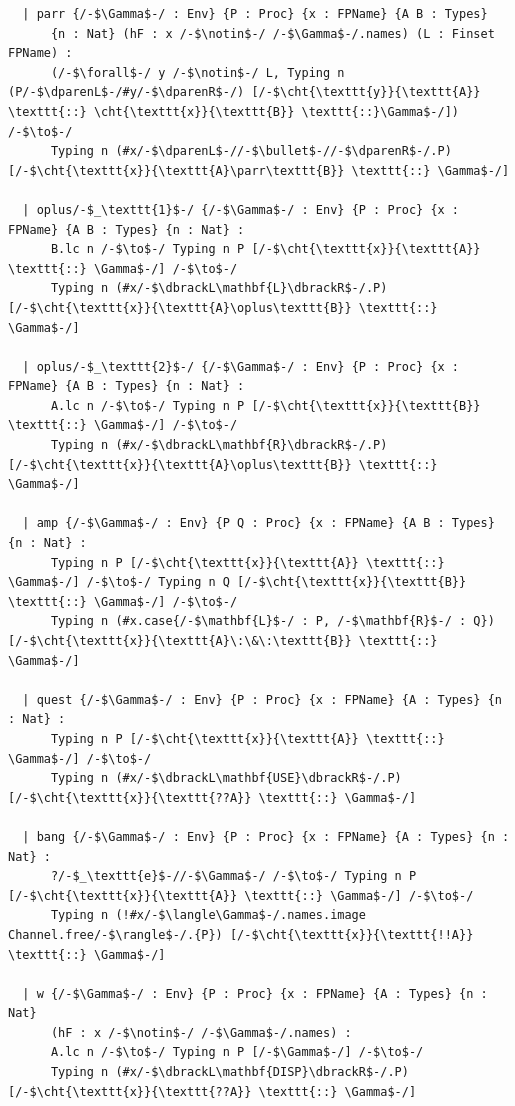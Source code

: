 \begin{lstlisting}
  | parr {/-$\Gamma$-/ : Env} {P : Proc} {x : FPName} {A B : Types}
      {n : Nat} (hF : x /-$\notin$-/ /-$\Gamma$-/.names) (L : Finset FPName) :
      (/-$\forall$-/ y /-$\notin$-/ L, Typing n (P/-$\dparenL$-/#y/-$\dparenR$-/) [/-$\cht{\texttt{y}}{\texttt{A}} \texttt{::} \cht{\texttt{x}}{\texttt{B}} \texttt{::}\Gamma$-/]) /-$\to$-/
      Typing n (#x/-$\dparenL$-//-$\bullet$-//-$\dparenR$-/.P) [/-$\cht{\texttt{x}}{\texttt{A}\parr\texttt{B}} \texttt{::} \Gamma$-/]

  | oplus/-$_\texttt{1}$-/ {/-$\Gamma$-/ : Env} {P : Proc} {x : FPName} {A B : Types} {n : Nat} :
      B.lc n /-$\to$-/ Typing n P [/-$\cht{\texttt{x}}{\texttt{A}} \texttt{::} \Gamma$-/] /-$\to$-/
      Typing n (#x/-$\dbrackL\mathbf{L}\dbrackR$-/.P) [/-$\cht{\texttt{x}}{\texttt{A}\oplus\texttt{B}} \texttt{::} \Gamma$-/]

  | oplus/-$_\texttt{2}$-/ {/-$\Gamma$-/ : Env} {P : Proc} {x : FPName} {A B : Types} {n : Nat} :
      A.lc n /-$\to$-/ Typing n P [/-$\cht{\texttt{x}}{\texttt{B}} \texttt{::} \Gamma$-/] /-$\to$-/
      Typing n (#x/-$\dbrackL\mathbf{R}\dbrackR$-/.P) [/-$\cht{\texttt{x}}{\texttt{A}\oplus\texttt{B}} \texttt{::} \Gamma$-/]

  | amp {/-$\Gamma$-/ : Env} {P Q : Proc} {x : FPName} {A B : Types} {n : Nat} :
      Typing n P [/-$\cht{\texttt{x}}{\texttt{A}} \texttt{::} \Gamma$-/] /-$\to$-/ Typing n Q [/-$\cht{\texttt{x}}{\texttt{B}} \texttt{::} \Gamma$-/] /-$\to$-/
      Typing n (#x.case{/-$\mathbf{L}$-/ : P, /-$\mathbf{R}$-/ : Q}) [/-$\cht{\texttt{x}}{\texttt{A}\:\&\:\texttt{B}} \texttt{::} \Gamma$-/]

  | quest {/-$\Gamma$-/ : Env} {P : Proc} {x : FPName} {A : Types} {n : Nat} :
      Typing n P [/-$\cht{\texttt{x}}{\texttt{A}} \texttt{::} \Gamma$-/] /-$\to$-/
      Typing n (#x/-$\dbrackL\mathbf{USE}\dbrackR$-/.P) [/-$\cht{\texttt{x}}{\texttt{??A}} \texttt{::} \Gamma$-/]

  | bang {/-$\Gamma$-/ : Env} {P : Proc} {x : FPName} {A : Types} {n : Nat} :
      ?/-$_\texttt{e}$-//-$\Gamma$-/ /-$\to$-/ Typing n P [/-$\cht{\texttt{x}}{\texttt{A}} \texttt{::} \Gamma$-/] /-$\to$-/
      Typing n (!#x/-$\langle\Gamma$-/.names.image Channel.free/-$\rangle$-/.{P}) [/-$\cht{\texttt{x}}{\texttt{!!A}} \texttt{::} \Gamma$-/]

  | w {/-$\Gamma$-/ : Env} {P : Proc} {x : FPName} {A : Types} {n : Nat}
      (hF : x /-$\notin$-/ /-$\Gamma$-/.names) :
      A.lc n /-$\to$-/ Typing n P [/-$\Gamma$-/] /-$\to$-/
      Typing n (#x/-$\dbrackL\mathbf{DISP}\dbrackR$-/.P) [/-$\cht{\texttt{x}}{\texttt{??A}} \texttt{::} \Gamma$-/]


\end{lstlisting}
